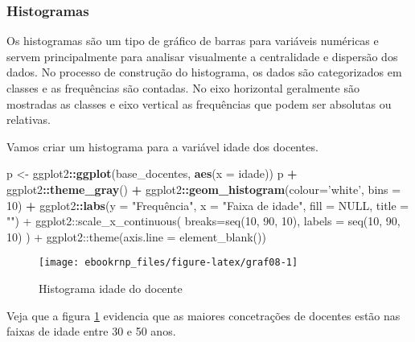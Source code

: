 \documentclass[12pt,]{style/krantz}
\makeatletter
\newenvironment{Shaded}{\begin{snugshade}}{\end{snugshade}}
\newcommand{\DataTypeTok}[1]{\textcolor[rgb]{0.13,0.29,0.53}{#1}}
\newcommand{\DecValTok}[1]{\textcolor[rgb]{0.00,0.00,0.81}{#1}}
\newcommand{\KeywordTok}[1]{\textcolor[rgb]{0.13,0.29,0.53}{\textbf{#1}}}
\newcommand{\NormalTok}[1]{#1}
\newcommand{\OperatorTok}[1]{\textcolor[rgb]{0.81,0.36,0.00}{\textbf{#1}}}
\newcommand{\StringTok}[1]{\textcolor[rgb]{0.31,0.60,0.02}{#1}}
\newenvironment{kframe}{%
\medskip{}
\setlength{\fboxsep}{.8em}
 \def\at@end@of@kframe{}%
 \ifinner\ifhmode%
  \def\at@end@of@kframe{\end{minipage}}%
  \begin{minipage}{\columnwidth}%
 \fi\fi%
 \def\FrameCommand##1{\hskip\@totalleftmargin \hskip-\fboxsep
 \colorbox{shadecolor}{##1}\hskip-\fboxsep
     \hskip-\linewidth \hskip-\@totalleftmargin \hskip\columnwidth}%
 \MakeFramed {\advance\hsize-\width
   \@totalleftmargin\z@ \linewidth\hsize
   \@setminipage}}%
 {\par\unskip\endMakeFramed%
 \at@end@of@kframe}
\renewenvironment{Shaded}{\begin{kframe}}{\end{kframe}}
\theoremstyle{definition}
\theoremstyle{definition}
\theoremstyle{definition}
\theoremstyle{remark}
\let\BeginKnitrBlock\begin \let\EndKnitrBlock\end
\makeatother
\begin{document}
\hypertarget{histogramas}{%
\subsubsection{Histogramas}\label{histogramas}}

Os histogramas são um tipo de gráfico de barras para variáveis numéricas e servem principalmente para analisar visualmente a centralidade e dispersão dos dados. No processo de construção do histograma, os dados são categorizados em classes e as frequências são contadas. No eixo horizontal geralmente são mostradas as classes e eixo vertical as frequências que podem ser absolutas ou relativas.

\BeginKnitrBlock{example}
\protect\hypertarget{exm:unnamed-chunk-55}{}{\label{exm:unnamed-chunk-55} }Vamos criar um histograma para a variável idade dos docentes.
\EndKnitrBlock{example}

\begin{Shaded}
\begin{Highlighting}[]
\NormalTok{p <-}\StringTok{ }\NormalTok{ggplot2}\OperatorTok{::}\KeywordTok{ggplot}\NormalTok{(base_docentes, }\KeywordTok{aes}\NormalTok{(}\DataTypeTok{x =}\NormalTok{ idade))}
\NormalTok{p }\OperatorTok{+}\StringTok{ }\NormalTok{ggplot2}\OperatorTok{::}\KeywordTok{theme_gray}\NormalTok{() }\OperatorTok{+}
\StringTok{  }\NormalTok{ggplot2}\OperatorTok{::}\KeywordTok{geom_histogram}\NormalTok{(}\DataTypeTok{colour=}\StringTok{'white'}\NormalTok{, }\DataTypeTok{bins =} \DecValTok{10}\NormalTok{) }\OperatorTok{+}
\StringTok{  }\NormalTok{ggplot2}\OperatorTok{::}\KeywordTok{labs}\NormalTok{(}\DataTypeTok{y =} \StringTok{"Frequência", x = "}\NormalTok{Faixa de idade}\StringTok{", fill = NULL, title = "") +}
\StringTok{    ggplot2::scale_x_continuous(}
\StringTok{      breaks=seq(10, 90, 10),}
\StringTok{      labels = seq(10, 90, 10)}
\StringTok{    ) +}
\StringTok{  ggplot2::theme(axis.line = element_blank())}
\end{Highlighting}
\end{Shaded}

\begin{figure}[H]

{\centering \texttt{[image: ebookrnp\_files/figure-latex/graf08-1]} 

}

\caption{Histograma idade do docente}\label{fig:graf08}
\end{figure}

Veja que a figura \ref{fig:graf08} evidencia que as maiores concetrações de docentes estão nas faixas de idade entre 30 e 50 anos.
\end{document}
